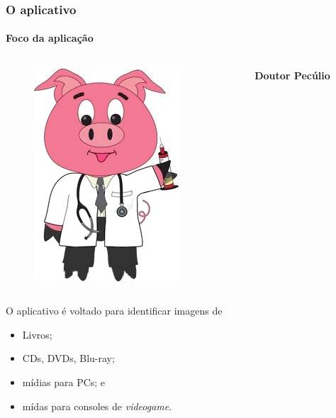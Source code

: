 \documentclass[14pt,beamer]{beamer}
\begin{document}
\begin{frame}
	\frametitle{O aplicativo}
    \framesubtitle{Foco da aplicação}
	
	\vspace{-30px}
	\begin{columns}
		\begin{column}{.3\textwidth}
			\begin{figure}
				\includegraphics[scale=.15]{imagens/docpig}
			\end{figure}
		\end{column}%
		\hfill%
		\begin{column}{9\textwidth}
			\large{\textbf{Doutor Pecúlio}}
		\end{column}%
	\end{columns}
	
	\vspace{10px}
    O aplicativo é voltado para identificar imagens de
	\begin{itemize}
        \item Livros;
        \item CDs, DVDs, Blu-ray;
        \item mídias para PCs; e
        \item mídas para consoles de \emph{videogame}.
	\end{itemize}
\end{frame}
\end{document}
